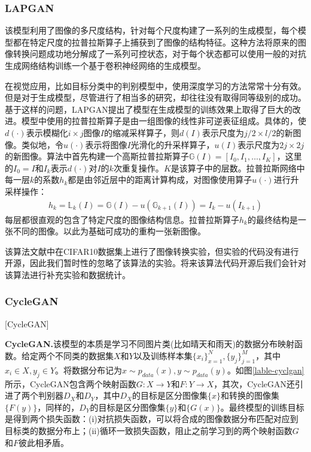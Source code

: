 \subsubsection{LAPGAN}

 该模型利用了图像的多尺度结构，针对每个尺度构建了一系列的生成模型，每个模型都在特定尺度的拉普拉斯算子\cite{lapcode}上捕获到了图像的结构特征。这种方法将原来的图像转换问题成功地分解成了一系列可控状态，对于每个状态都可以使用一般的对抗生成网络结构训练一个基于卷积神经网络的生成模型。

在视觉应用，比如目标分类中的判别模型中，使用深度学习的方法常常十分有效。但是对于生成模型，尽管进行了相当多的研究\cite{lapgan1}\cite{lapgan2}\cite{lapgan3}，却往往没有取得同等级别的成功。基于这样的问题，LAPGAN提出了模型在生成模型的训练效果上取得了巨大的改进。模型中使用的拉普拉斯算子是由一组图像的线性非可逆表征组成。具体的，使$d(\cdot)$表示模糊化$i\times j$图像$I$的缩减采样算子，则$d(I)$表示尺度为$j/2\times l/2$的新图像。类似地，令$u(\cdot)$表示将图像$I$光滑化的升采样算子，$u(I)$表示尺度为$2j\times 2j$的新图像。算法中首先构建一个高斯拉普拉斯算子$\mathbb{G}(I)=[I_0,I_1,\dots,I_K]$，这里的$I_0=I$和$I_k$表示$d(\cdot)$对$I$的$k$次重复操作。$K$是该算子中的层数。拉普拉斯网络中每一层$k$的系数$h_k$都是由邻近层中的距离计算构成，对图像使用算子$u(\cdot)$进行升采样操作：
\begin{gather}
    h_k=\mathbb{L}_k(I)=\mathbb{G}(I)-u(\mathbb{G}_{k+1}(I))=I_k-u(I_{k+1})
\end{gather}
每层都很直观的包含了特定尺度的图像结构信息。拉普拉斯算子$h_k$的最终结构是一张不同的图像。以此为基础可成功的重构一张新图像。

该算法文献\cite{LAPGAN}中在CIFAR10数据集上进行了图像转换实验，但实验的代码没有进行开源，因此我们暂时性的忽略了该算法的实验。将来该算法代码开源后我们会针对该算法进行补充实验和数据统计。 


\subsubsection{CycleGAN}[CycleGAN]

\textbf{CycleGAN.}\cite{CycleGAN}\quad 该模型的本质是学习不同图片类(比如晴天和雨天)的数据分布映射函数。给定两个不同类的数据集$X$和$Y$以及训练样本集$\{x_i\}_{x=1}^N, \{y_j\}_{j=1}^M$，其中$x_i\in X, y_j\in Y$。将数据分布记为$x\sim p_{data}(x), y\sim p_{data}(y)$。如图\ref{lable-cyclgan}所示，CycleGAN包含两个映射函数$G: X\to Y$和$F: Y\to X$，其次，CycleGAN还引进了两个判别器$D_X$和$D_Y$，其中$D_X$的目标是区分图像集$\{x\}$和转换的图像集$\{F(y)\}$，同样的，$D_Y$的目标是区分图像集$\{y\}$和$\{G(x)\}$。最终模型的训练目标是得到两个损失函数：(i)对抗损失函数，可以将合成的图像数据分布匹配对应到目标类的数据分布上；(ii)循环一致损失函数，阻止之前学习到的两个映射函数$G$和$F$彼此相矛盾。

